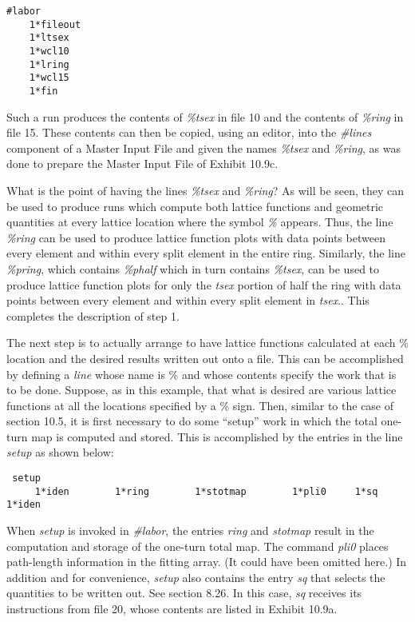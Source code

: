 \begin{footnotesize}
\begin{verbatim}
#labor
    1*fileout
    1*ltsex
    1*wcl10
    1*lring
    1*wcl15
    1*fin
\end{verbatim}
\end{footnotesize}
Such a \Mary run produces the contents of {\em \%tsex} in file 10 and the
contents of {\em \%ring} in file 15.  These contents can then be copied,
using an editor, into the {\em \#lines} component of a Master Input File
and given the names {\em \%tsex} and {\em \%ring}, as was done to prepare
the Master Input File of Exhibit 10.9c.

What is the point of having the lines {\em \%tsex} and {\em \%ring}?  As
will be seen, they can be used to produce \Mary runs which compute both
lattice functions and geometric quantities at every lattice location
where the symbol {\em \%} appears.  Thus, the line {\em \%ring} can be
used to produce lattice function plots with data points between every
element and within every split element in the entire ring.  Similarly,
the line {\em \%pring}, which contains {\em \%phalf} which in turn
contains {\em \%tsex}, can be used to produce lattice function plots for
only the {\em tsex} portion of half the ring with data points between
every element and within every split element in {\em tsex}..  This
completes the description of step 1.

The next step is to actually arrange to have lattice functions calculated
at each \% location and the desired results written out onto a file.
This can be accomplished by defining a {\em line} whose name is \% and
whose contents specify the work that is to be done.  Suppose, as in this
example, that what is desired are various lattice functions at all the
locations specified by a \% sign.  Then, similar to the case of section
10.5, it is first necessary to do some ``setup'' work in which the total
one-turn map is computed and stored.  This is accomplished by the entries in
the line {\em setup} as shown below:

\begin{footnotesize}
\begin{verbatim}
 setup
     1*iden        1*ring        1*stotmap        1*pli0     1*sq          1*iden
\end{verbatim}
\end{footnotesize}
When {\em setup} is invoked in {\em \#labor}, the entries {\em ring} and
{\em stotmap} result in the computation and storage of the one-turn
total map.  The command {\em pli0} places path-length information in the
fitting array.  (It could have been omitted here.)  In addition and for convenience, {\em setup} also contains
the entry {\em sq} that selects the quantities to be written out.  See
section 8.26.  In this case, {\em sq} receives its instructions from
file 20, whose contents are listed in Exhibit 10.9a.

